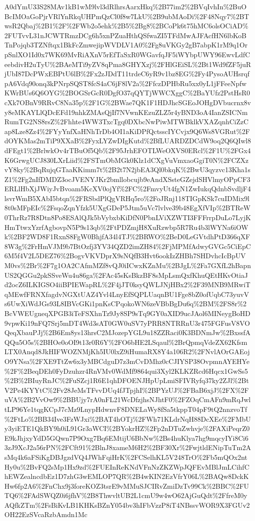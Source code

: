 \documentclass[11pt]{article}
\begin{document}
A0dYmU33S28MAv1kB1wM9lvl3dRlhrsAarxHkq\%2B77im2\%2BVqIvhIn\%2BuOBcIMOaGoPjrVRlYnRkqUHPmQzCl0f8w7LkU\%2B9ubMAoDi\%2F48Nqy7\%2BTwsR2Qbaj\%2B1\%2F\%2FWb2o5ehk\%2B5\%2Bg8\%2BCoPk6t75hMC6olsOCiAD\%2FUTvvL31nJCWTRmzDCg6h5xnPZuaHthQSfwaZI5TFdMwAJFAcfHN6lbKoBTnPojqb3TZNftqx1BkFcZmwejipWVDLV1A0\%2Fg8uVKGy2gB7abpK1rM9q1OrpSnlXO1Id0x7WK69MvRiAXnV5rEfTaSxR0WGavfqJF5iWYbpUWY96EwvLdfCeebdivH2uTyU\%2BAeMTi9yZV8qPma8GHYXzj\%2FHlGEiSL\%2Bt1Wd9fZF5juRjUbI87DcPWxEBPtU6lB\%2Fx2zJDdT11trdeC6yR9v1bz8EG\%2Fy4PysoAUHsrqfpA6Vdq90onq3kPNrpSQST8fcS4aC6jF8lV2a\%2FfczDPHbRu5xx0yL1jFFeeNpfwKWrBUs6Q6OYG\%2BOGSrGcR0DgfO37qQYTjWWCXggC\%2BaYUfz2PstHsR0cXk7OBnV9RRvC8Na35p\%2F1G\%2BWae7QK1F1HDJhcSGEoJOHgDVbucrnx8vy8eMKAYLlQDcEFd19nhkZMAsQjIf7NVwnKEzuZLZ5r4yBND3oA4IanZSICNmRumTG2NS8rsZ\%2Fhhte4WW3TxcTgq0DXbcNwPiwMTWBklkVXAZqnhCiZzCap8Lze8Zz4\%2FYyYnfXaHNhTrDb4OI1aKiDPfQctsscIYCvjx9Q6Ws8VGRut\%2FdOYKMas2mTiP9XXaB\%2FyxLYZwDIgKutd\%2BfLUARDZDCdW9oq2Q6QIwl8dFEgt1\%2BrlwkOv4rTBuOf5Qb\%2F95JrhEFOTLWeOXVS0ERcl\%2F1U\%2FGx4K6GrwgUCJ830LXrLiid\%2FSTmObMGk0Klz1dCXgVuVmxaoGgiT0N\%2FCZXzvY8ky\%2BqRujqGTaaKKimm7t\%2B2t7N2jbEA3Ql0bkqK\%2BwU3qyzvc13Kha1sZ1\%2Fg2nIfDMDZ3ocJVENYJKr2bmllobcujb9eAndXSsteGZejdSHVlmyOPpCF3ERLlHbXjJWiyJvBvoam5KcXV0ojYf\%2FC\%2FmvyUt4fgN1ZwIukqQdnbSvdljF4lsvrWmB5XAbI5btqn\%2FRSbdPlQgVRHq5ro\%2FoJRnj118TIGpKSk7cuIDMix9l8t0sMFpEIc\%2FsqoZqnYfzk5UXgGDeP5Jtm5uVc7lvlve39b48EgXfVIp\%2BTReW0ThrRz7R8Dtn8Po8ESAlQJk5bVybxbKiDfN0PbnLViXZWTI3FFFrrpDuLo7LyjKHmTtwxYzrfAgbovpN5P9s13qb\%2FtPDZmjH8XuRzwbp5R7Ru4b3lWYNa6iOWk\%2BF2WD8F1RxnS8FgW0BhjfA34l4TJ\%2BRWO\%2BeD0LeGVtdhPtD366qXF8W3g\%2FrHmVJM9b7BtOzfj3YV34QZD2imZH84\%2FjMPMfAdwyGVGc5CiEpC6M5f4V2L5DEZ76\%2BogvVKVDprX9sNQfB3Hvt6ookIzZHBh7SHDvhcIcBpUVM0vs\%2Br\%2F7g1OA2CAfmMZf8vQJ0iICwxKZnMu\%2BJgL\%2Fa7GXfL2hBapnUS2QGGu2pkSSveWu4u86ga\%2FAc45sKsBkzBF8sMpLsmQxfKhuQEtHKvOtiaJd2ocZ6ILKIGSO4iiBPIEWapRL\%2F4jJT0ksyQWLJNjHBx2\%2F39MNB9MRwiTqMEwfFRNXfagdvNGXtUAZ4Yvl4LnyEfSQPLUaqnBU1Fge8bZ0ofUqbC73yuvVs6UwXiWdJGs93L8IBVcGKi1pnKsCPqokoWN6zeVBbBgDu6q\%2BM\%2FS8r\%2BcVWEUgneqXPGB3iTeFSXhnTz9Jy8SP9sTq9GY0aXID9ucJAol6MINeygBoHD9vpwKi19nFQ7Srj5mDT4Wd3sAT0GW0uSV7yPRR8NTRRnU3r475FGFusV8VOQeqXbauPJj\%2B6Em8ys13hrsC2MJozepYGL9u18ZZRaci0K3BDNmJw\%2BxssfAQQu5O5s\%2BHOe0oOI9t13r0R6Y\%2FO6bHE2LSqaul\%2BrQpmqVdeZX62KfsmLTX0Anqd8JkHIFWOZNMjKh5IU0lxZ9iHumaRX8Y4a106R2\%2FNvlAOrGAEojO9YNsa\%2FXE9TtZw6x3yMBCdguD7z3mCvDMhz0cCJIYSP38OvpmnAYEHYe\%2F\%2BeqDEh0FyDzuhzr4RnVMv0WdMf9864qui3Xyl2KLKZRcd6Hqcx1GwSs5\%2B\%2BIuyRnJC\%2FuSZcj1R6E1qhDFOENJHpUpLmiSFIVRyfq37ky2ZJl\%2BtV2Pe4KYYtC\%2Fv28JeMsTFvvDUq4fJTpjhI\%2BPYzUJ\%2FBaB6xjJ\%2FX\%2FuVA\%2B2VvOw9\%2BBUjy7rA0nFL21WcDfzjhsNJhtF0\%2FZOqCmAFn9mRqJwltLP96Ye1tqgKCpJ7cMz9LnypHdwnvF8DNELaWy8fSa5tkppT04pF9tQ2nnzvoTf\%2FtLo\%2BB34Ive3FzWJxi\%2BAT4hOTj\%2FWh71KLdrNqH88DcXEe\%2FMbUy3yiETE1QkBY9h0iL91Gr3aWCI\%2BYokrHZ\%2Fp2nDTuZwhvje\%2FAXiPeqrZ0E9kJhjxyYdD5GQwn7P9Oxg7Bq6EMtijU6BbNw\%2Bs4huKlya7hg9mqcyIYi8Ci63zJ9XcJ2a56rPN\%2FCft91\%2BlnJ8xameM6H2\%2BF30Xr\%2FwjtldENipTuTm2AsMq4k6aFSiKgDBJgzdVQ4JWhFqiHrK\%2FCSelhKL5V248TrO\%2Fb5mQOx2ntHy0u\%2BvFQ2sMp1Hx9zd\%2FUEInReKNdVFnNzZKZWpJQFEvMBlJmLCihfChEWZealncdbEz1D7zhG3wEMLOP7QR\%2B4wKIN2EzVfrY06L\%2BAQw8DckKHw6fp2A6\%2FnChx9j3foreKOZ3tsrE9vMMuSJCIRvZmiDzTv99Ck\%2BBC\%2FUTQ6\%2FAdSWQZ0i6jfhV\%2B8ThwvltUB2L1cmU9w4wO62AjGuQdt\%2FfreM0yAQfkZTm\%2FsBiKvLB1KHKsBZnY054bv3hIFbVzzP8iT4NBssvWOR9X3FGUv2OH22EzSVcaRzbAmdn1Mc
\end{document}
